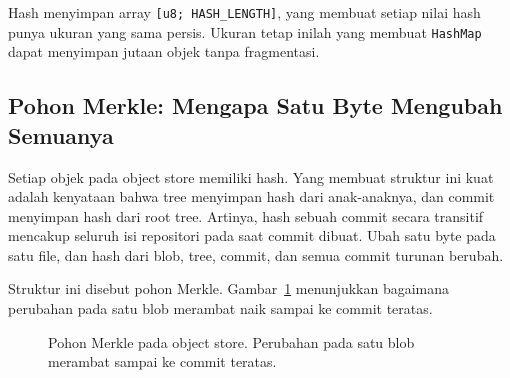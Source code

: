 \documentclass[11pt,a4paper]{article}
\begin{document}
Hash menyimpan array \texttt{[u8; HASH\_LENGTH]}, yang membuat setiap nilai hash punya ukuran yang sama persis. Ukuran tetap inilah yang membuat \texttt{HashMap} dapat menyimpan jutaan objek tanpa fragmentasi.

\subsection{Pohon Merkle: Mengapa Satu Byte Mengubah Semuanya}

Setiap objek pada object store memiliki hash. Yang membuat struktur ini kuat adalah kenyataan bahwa tree menyimpan hash dari anak-anaknya, dan commit menyimpan hash dari root tree. Artinya, hash sebuah commit secara transitif mencakup seluruh isi repositori pada saat commit dibuat. Ubah satu byte pada satu file, dan hash dari blob, tree, commit, dan semua commit turunan berubah.

Struktur ini disebut pohon Merkle. Gambar~\ref{fig:merkle} menunjukkan bagaimana perubahan pada satu blob merambat naik sampai ke commit teratas.

\begin{figure}[H]
	\centering
	\caption{Pohon Merkle pada object store. Perubahan pada satu blob merambat sampai ke commit teratas.}
	\label{fig:merkle}
\end{figure}
\end{document}
